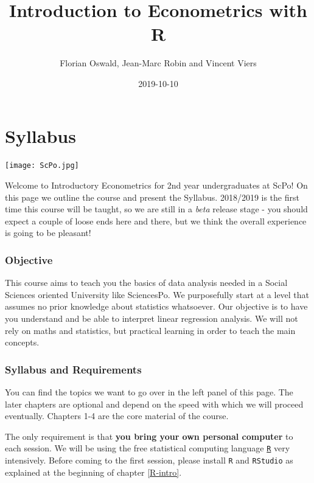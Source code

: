 \documentclass[]{book}
\title{Introduction to Econometrics with R}
\author{Florian Oswald, Jean-Marc Robin and Vincent Viers}
\date{2019-10-10}
\begin{document}
\maketitle

{
\setcounter{tocdepth}{1}
\tableofcontents
}
\hypertarget{syllabus}{%
\chapter*{Syllabus}\label{syllabus}}

\texttt{[image: ScPo.jpg]}

Welcome to Introductory Econometrics for 2nd year undergraduates at ScPo! On this page we outline the course and present the Syllabus. 2018/2019 is the first time this course will be taught, so we are still in a \emph{beta} release stage - you should expect a couple of loose ends here and there, but we think the overall experience is going to be pleasant!

\hypertarget{objective}{%
\subsection*{Objective}\label{objective}}

This course aims to teach you the basics of data analysis needed in a Social Sciences oriented University like SciencesPo. We purposefully start at a level that assumes no prior knowledge about statistics whatsoever. Our objective is to have you understand and be able to interpret linear regression analysis. We will not rely on maths and statistics, but practical learning in order to teach the main concepts.

\hypertarget{syllabus-and-requirements}{%
\subsection*{Syllabus and Requirements}\label{syllabus-and-requirements}}

You can find the topics we want to go over in the left panel of this page. The later chapters are optional and depend on the speed with which we will proceed eventually. Chapters 1-4 are the core material of the course.

The only requirement is that \textbf{you bring your own personal computer} to each session. We will be using the free statistical computing language \href{https://www.r-project.org}{\texttt{R}} very intensively. Before coming to the first session, please install \texttt{R} and \texttt{RStudio} as explained at the beginning of chapter \ref{R-intro}.
\end{document}
